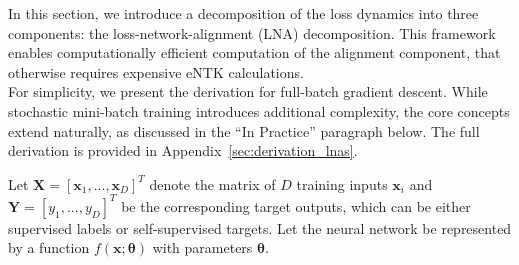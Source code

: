 
In this section, we introduce a decomposition of the loss dynamics into three components: the loss-network-alignment (LNA) decomposition. This framework enables computationally efficient computation of the alignment component, that otherwise requires expensive eNTK calculations. \\
For simplicity, we present the derivation for full-batch gradient descent. While stochastic mini-batch training introduces additional complexity, the core concepts extend naturally, as discussed in the ``In Practice'' paragraph below. The full derivation is provided in Appendix~\ref{sec:derivation_lnas}.

Let \(\mathbf{X}=[\mathbf{x}_1, ..., \mathbf{x}_D]^T\) denote the matrix of \(D\) training inputs \(\mathbf{x}_i\) and \(\mathbf{Y}=[y_1, ..., y_D]^T\) be the corresponding target outputs, which can be either supervised labels or self-supervised targets.
Let the neural network be represented by a function \(f(\mathbf{x}; \boldsymbol{\theta})\) with parameters \(\boldsymbol{\theta}\).

